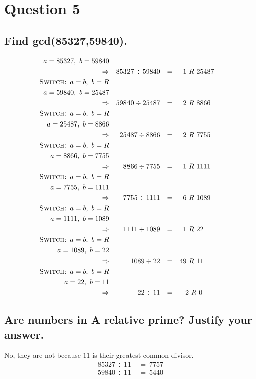 \documentclass{report}
\begin{document}
	\section{Question 5}
	\startsection
		\renewcommand{\thesubsection}{\thesection.\Alph{subsection}}
		\subsection{Find gcd(85327,59840).}
		\begin{align*}
			a = 85327, \ b = 59840 \\
			\Rightarrow && 85327 \div 59840 && = && 1 \ & R \ 25487 \\
			\textsc{Switch: } a = b, \ b = R \\
			a = 59840, \ b = 25487 \\
			\Rightarrow && 59840 \div 25487 && = && 2 \ & R \ 8866 \\
			\textsc{Switch: } a = b, \ b = R \\
			a = 25487, \ b = 8866 \\
			\Rightarrow && 25487 \div 8866 && = && 2 \ & R \ 7755 \\
			\textsc{Switch: } a = b, \ b = R \\
			a = 8866, \ b = 7755 \\
			\Rightarrow && 8866 \div 7755 && = && 1 \ & R \ 1111 \\
			\textsc{Switch: } a = b, \ b = R \\
			a = 7755, \ b = 1111 \\
			\Rightarrow && 7755 \div 1111 && = && 6 \ & R \ 1089 \\
			\textsc{Switch: } a = b, \ b = R \\
			a = 1111, \ b = 1089 \\
			\Rightarrow && 1111 \div 1089 && = && 1 \ & R \ 22 \\
			\textsc{Switch: } a = b, \ b = R \\
			a = 1089, \ b = 22 \\
			\Rightarrow && 1089 \div 22 && = && 49 \ & R \ 11 \\
			\textsc{Switch: } a = b, \ b = R \\
			a = 22, \ b = 11 \\
			\Rightarrow && 22 \div 11 && = && 2 & \ R \ 0 \\
		\end{align*}
		\subsection{Are numbers in A relative prime? Justify your answer.}
		\startsubsection
			No, they are not because $11$ is their greatest common divisor.
			\begin{align*}
				85327 \div 11 \ &= \ 7757 \\
				59840 \div 11 \ &= \ 5440
			\end{align*}
		\closesection
\end{document}
